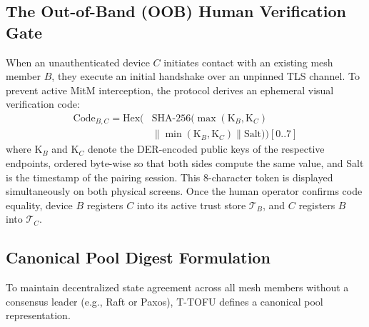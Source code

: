 \documentclass[conference,a4paper]{IEEEtran}
\begin{document}
\subsection{The Out-of-Band (OOB) Human Verification Gate}
When an unauthenticated device $C$ initiates contact with an existing mesh member $B$, they execute an initial handshake over an unpinned TLS channel. To prevent active MitM interception, the protocol derives an ephemeral visual verification code:
\begin{equation}
\begin{split}
    \text{Code}_{B,C} = \text{Hex}\Big(&\text{SHA-256}\big(\max(\text{K}_B, \text{K}_C) \\
    &\parallel \min(\text{K}_B, \text{K}_C) \parallel \text{Salt}\big)\Big)[0..7]
\end{split}
\label{eq:code}
\end{equation}
where $\text{K}_B$ and $\text{K}_C$ denote the DER-encoded public keys of the respective endpoints, ordered byte-wise so that both sides compute the same value, and Salt is the timestamp of the pairing session. This 8-character token is displayed simultaneously on both physical screens. Once the human operator confirms code equality, device $B$ registers $C$ into its active trust store $\mathcal{T}_B$, and $C$ registers $B$ into $\mathcal{T}_C$.

\subsection{Canonical Pool Digest Formulation}
To maintain decentralized state agreement across all mesh members without a consensus leader (e.g., Raft or Paxos), T-TOFU defines a canonical pool representation.
\end{document}

